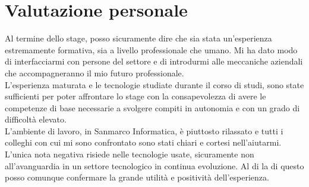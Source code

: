 \section{Valutazione personale}
Al termine dello stage, posso sicuramente dire che sia stata un'esperienza estremamente formativa, sia a livello professionale che umano. Mi ha dato modo di interfacciarmi con persone del settore e di introdurmi alle meccaniche aziendali che accompagneranno il mio futuro professionale.\\
L'esperienza maturata e le tecnologie studiate durante il corso di studi, sono state sufficienti per poter affrontare lo stage con la consapevolezza di avere le competenze di base necessarie a svolgere compiti in autonomia e con un grado di difficoltà elevato.\\
L'ambiente di lavoro, in Sanmarco Informatica, è piuttosto rilassato e tutti i colleghi con cui mi sono confrontato sono stati chiari e cortesi nell'aiutarmi.\\ L'unica nota negativa risiede nelle tecnologie usate, sicuramente non all'avanguardia in un settore tecnologico in continua evoluzione. Al di la di questo posso comunque confermare la grande utilità e positività dell'esperienza.\\

\newpage